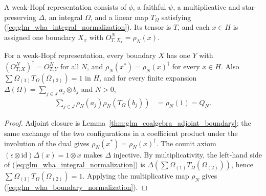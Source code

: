 \begin{definition}
    \label{def:glm_wha_representation}
    \leanok
    A weak-Hopf representation consists of $\phi$, a faithful $\psi$, a
    multiplicative and star-preserving $\Delta$, an integral $\Omega$, and a
    linear map $T_\Omega$ satisfying
    (\ref{eq:glm_wha_integral_normalization}). Its tensor is $T$, and each
    $x\in H$ is assigned one boundary $X_x$ with $O^N_{T,X_x}=\rho_N(x)$.
\end{definition}

\begin{lemma}
    \label{thm:glm_wha_integral_normalization}
    \leanok
    For a weak-Hopf representation, every boundary $X$ has one $Y$ with
    $(O^N_{T,X})^\dagger=O^N_{T,Y}$ for all $N$, and
    $\rho_N(x^*)=\rho_N(x)^\dagger$ for every $x\in H$. Also
    $\sum\Omega_{(1)}T_\Omega(\Omega_{(2)})=1$ in $H$, and for every finite
    expansion $\Delta(\Omega)=\sum_{j\in J}a_j\otimes b_j$ and $N>0$,
    \begin{align}
        \sum_{j\in J}\rho_N(a_j)\rho_N(T_\Omega(b_j)) & =\rho_N(1)=Q_N.
        \label{eq:glm_wha_boundary_normalization}
    \end{align}
\end{lemma}
\begin{proof}
    \leanok
    Adjoint closure is Lemma~\ref{thm:glm_coalgebra_adjoint_boundary}; the
    same exchange of the two configurations in a coefficient product under the
    involution of the dual gives $\rho_N(x^*)=\rho_N(x)^\dagger$. The
    counit axiom $(\epsilon\otimes\mathrm{id})\Delta(x)=1\otimes x$ makes
    $\Delta$ injective. By multiplicativity, the left-hand side of
    (\ref{eq:glm_wha_integral_normalization}) is
    $\Delta(\sum\Omega_{(1)}T_\Omega(\Omega_{(2)}))$, hence
    $\sum\Omega_{(1)}T_\Omega(\Omega_{(2)})=1$. Applying the multiplicative map
    $\rho_N$ gives (\ref{eq:glm_wha_boundary_normalization}).
\end{proof}

